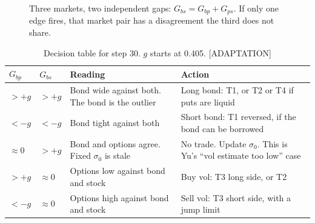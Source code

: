 \documentclass[10pt,a4paper]{article}
\newcommand{\ADAPT}{\textsf{\footnotesize\textcolor{tagadapt}{[ADAPTATION]}}}
\newcommand{\Zm}{Z_{\mathrm{mkt}}}
\newcommand{\Zo}{Z_{\mathrm{opt}}}
\newcommand{\Zs}{Z_{\mathrm{stk}}}
\newcommand{\Gbp}{G_{bp}}
\newcommand{\Gbs}{G_{bs}}
\newcommand{\Gps}{G_{ps}}
\begin{document}
\begin{figure}[ht]
\centering
{}
\caption{Three markets, two independent gaps: $\Gbs=\Gbp+\Gps$. If only one edge fires, that market pair has a disagreement the third does not share.}
\end{figure}

\begin{table}[ht]
\centering\footnotesize
\begin{tabularx}{\textwidth}{@{}>{\raggedright\arraybackslash}p{1.7cm}>{\raggedright\arraybackslash}p{1.7cm}>{\raggedright\arraybackslash}X>{\raggedright\arraybackslash}X@{}}
\toprule
$\Gbp$ & $\Gbs$ & Reading & Action\\
\midrule
$>+g$ & $>+g$ & Bond wide against both. The bond is the outlier & Long bond: T1, or T2 or T4 if puts are liquid\\
$<-g$ & $<-g$ & Bond tight against both & Short bond: T1 reversed, if the bond can be borrowed\\
$\approx0$ & $>+g$ & Bond and options agree. Fixed $\sigma_0$ is stale & No trade. Update $\sigma_0$. This is Yu's ``vol estimate too low'' case\\
$>+g$ & $\approx0$ & Options low against bond and stock & Buy vol: T3 long side, or T2\\
$<-g$ & $\approx0$ & Options high against bond and stock & Sell vol: T3 short side, with a jump limit\\
\bottomrule
\end{tabularx}
\caption{Decision table for step 30. $g$ starts at 0.405. \ADAPT}
\label{tab:decide}
\end{table}
\end{document}
